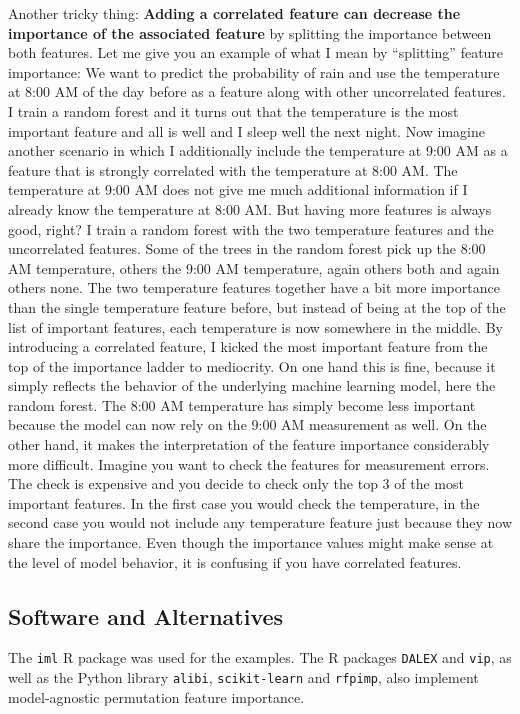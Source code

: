 \documentclass[12pt,]{krantz}
\begin{document}
Another tricky thing: \textbf{Adding a correlated feature can decrease
the importance of the associated feature} by splitting the importance
between both features. Let me give you an example of what I mean by
``splitting'' feature importance: We want to predict the probability of
rain and use the temperature at 8:00 AM of the day before as a feature
along with other uncorrelated features. I train a random forest and it
turns out that the temperature is the most important feature and all is
well and I sleep well the next night. Now imagine another scenario in
which I additionally include the temperature at 9:00 AM as a feature
that is strongly correlated with the temperature at 8:00 AM. The
temperature at 9:00 AM does not give me much additional information if I
already know the temperature at 8:00 AM. But having more features is
always good, right? I train a random forest with the two temperature
features and the uncorrelated features. Some of the trees in the random
forest pick up the 8:00 AM temperature, others the 9:00 AM temperature,
again others both and again others none. The two temperature features
together have a bit more importance than the single temperature feature
before, but instead of being at the top of the list of important
features, each temperature is now somewhere in the middle. By
introducing a correlated feature, I kicked the most important feature
from the top of the importance ladder to mediocrity. On one hand this is
fine, because it simply reflects the behavior of the underlying machine
learning model, here the random forest. The 8:00 AM temperature has
simply become less important because the model can now rely on the 9:00
AM measurement as well. On the other hand, it makes the interpretation
of the feature importance considerably more difficult. Imagine you want
to check the features for measurement errors. The check is expensive and
you decide to check only the top 3 of the most important features. In
the first case you would check the temperature, in the second case you
would not include any temperature feature just because they now share
the importance. Even though the importance values might make sense at
the level of model behavior, it is confusing if you have correlated
features.

\subsection{Software and
Alternatives}\label{software-and-alternatives-2}

The \texttt{iml} R package was used for the examples. The R packages
\texttt{DALEX} and \texttt{vip}, as well as the Python library
\texttt{alibi}, \texttt{scikit-learn} and \texttt{rfpimp}, also
implement model-agnostic permutation feature importance.
\end{document}
